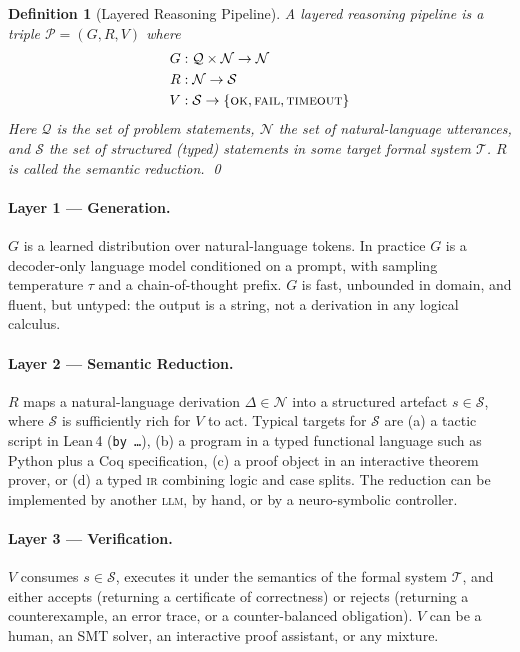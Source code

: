 \documentclass[11pt,a4paper]{article}
\newtheorem{definition}{Definition}
\newcommand{\LLM}{\textsc{llm}}
\newcommand{\IR}{\textsc{ir}}
\newcommand{\Coq}{Coq}
\newcommand{\LeanFour}{Lean\,4}
\begin{document}
\begin{definition}[Layered Reasoning Pipeline]
\label{def:three-layer}
A \emph{layered reasoning pipeline} is a triple
$\mathcal{P} = (G, R, V)$ where
\begin{align*}
G &: \mathcal{Q} \times \mathcal{N} \to \mathcal{N} \\
R &: \mathcal{N} \to \mathcal{S} \\
V &: \mathcal{S} \to \{\textsc{ok}, \textsc{fail}, \textsc{timeout}\}
\end{align*}
Here $\mathcal{Q}$ is the set of problem statements,
$\mathcal{N}$ the set of natural-language utterances,
and $\mathcal{S}$ the set of structured (\emph{typed}) statements
in some target formal system $\mathcal{T}$.  $R$ is called the
\emph{semantic reduction}.  \qed
\end{definition}

\paragraph{Layer 1 --- Generation.}
$G$ is a learned distribution over natural-language tokens.  In
practice $G$ is a decoder-only language model conditioned on a
prompt, with sampling temperature $\tau$ and a chain-of-thought
prefix.  $G$ is fast, unbounded in domain, and fluent, but
untyped: the output is a string, not a derivation in any logical
calculus.

\paragraph{Layer 2 --- Semantic Reduction.}
$R$ maps a natural-language derivation $\Delta \in \mathcal{N}$ into
a structured artefact $s \in \mathcal{S}$, where $\mathcal{S}$ is
sufficiently rich for $V$ to act.  Typical targets for $\mathcal{S}$
are (a) a tactic script in \LeanFour{} (\texttt{by \ldots}), (b) a
program in a typed functional language such as Python plus a
\Coq{} specification, (c) a proof object in an interactive
theorem prover, or (d) a typed \IR{} combining logic and case
splits.  The reduction can be implemented by another \LLM{}, by
hand, or by a neuro-symbolic controller.

\paragraph{Layer 3 --- Verification.}
$V$ consumes $s \in \mathcal{S}$, executes it under the semantics of
the formal system $\mathcal{T}$, and either accepts (returning a
certificate of correctness) or rejects (returning a counterexample,
an error trace, or a counter-balanced obligation).  $V$ can be a
human, an SMT solver, an interactive proof assistant, or any
mixture.
\end{document}
